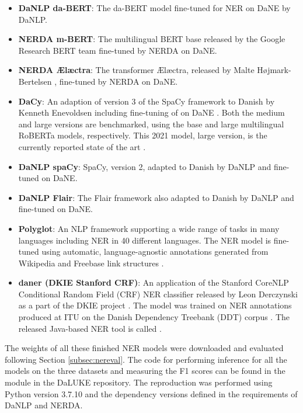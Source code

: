 \documentclass[main.tex]{subfiles}
\begin{document}
\begin{itemize}
    \item \textbf{DaNLP da-BERT}: The da-BERT model \cite{botxo2019dabert} fine-tuned for NER on DaNE by DaNLP.
    \item \textbf{NERDA m-BERT}: The multilingual BERT base released by the Google Research BERT team \cite{devlin2019bert} fine-tuned by NERDA \cite{kjeldgaard2020nerda} on DaNE.
    \item \textbf{NERDA Ælæctra}: The transformer Ælæctra, released by Malte Højmark-Bertelsen \cite{bertelsen2020lctra}, fine-tuned by NERDA on DaNE.
    \item \textbf{DaCy}: An adaption of version 3 of the SpaCy framework \cite{honnibal2020spacy} to Danish by Kenneth Enevoldsen including fine-tuning of on DaNE \cite{enevoldsen2020dacy}.
        Both the medium and large versions are benchmarked, using the base and large multilingual RoBERTa \cite{conneau2020unsupervised} models, respectively.
        This 2021 model, large version, is the currently reported state of the art \cite{enevoldsen2020dacy, danlp2021}.
    \item \textbf{DaNLP spaCy}: SpaCy, version 2, adapted to Danish by DaNLP and fine-tuned on DaNE.
    \item \textbf{DaNLP Flair}: The Flair framework \cite{akbik2019flair} also adapted to Danish by DaNLP and fine-tuned on DaNE.
    \item \textbf{Polyglot}: An NLP framework supporting a wide range of tasks in many languages including NER in 40 different languages.
        The NER model is fine-tuned using automatic, language-agnostic annotations generated from Wikipedia and Freebase link structures \cite{rfou2015polyglot}.
    \item \textbf{daner (DKIE Stanford CRF)}: An application of the Stanford CoreNLP Conditional Random Field (CRF) NER classifier \cite{manning2014corenlp} released by Leon Derczynski as a part of the DKIE project \cite{derc2014dkie}.
    The model was trained on NER annotations produced at ITU on the Danish Dependency Treebank (DDT) corpus \cite{kromann2003ddt}.
    The released Java-based NER tool is called \footnotemark.
\end{itemize}
\noindent
The weights of all these finished NER models were downloaded and evaluated following Section \ref{subsec:nereval}.
The code for performing inference for all the models on the three datasets and measuring the F1 scores can be found in the module  in the DaLUKE repository\footnotemark.
The reproduction was performed using Python version 3.7.10 and the dependency versions defined in the requirements of DaNLP and NERDA.
\end{document}
